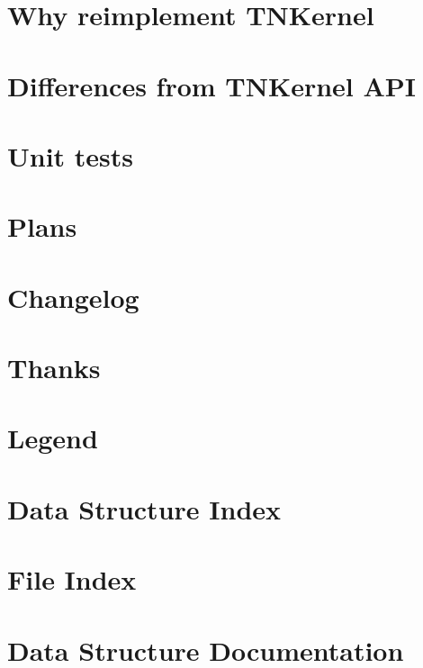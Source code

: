 \documentclass[twoside]{book}
\newcommand{\+}{\discretionary{\mbox{\scriptsize$\hookleftarrow$}}{}{}}
\begin{document}
\chapter{Why reimplement T\+N\+Kernel}
\label{why_reimplement}
\hypertarget{why_reimplement}{}

\chapter{Differences from T\+N\+Kernel A\+P\+I}
\label{tnkernel_diff}
\hypertarget{tnkernel_diff}{}

\chapter{Unit tests}
\label{unit_tests}
\hypertarget{unit_tests}{}

\chapter{Plans}
\label{plans}
\hypertarget{plans}{}

\chapter{Changelog}
\label{changelog}
\hypertarget{changelog}{}

\chapter{Thanks}
\label{thanks}
\hypertarget{thanks}{}

\chapter{Legend}
\label{legend}
\hypertarget{legend}{}

\chapter{Data Structure Index}

\chapter{File Index}

\chapter{Data Structure Documentation}












\end{document}
